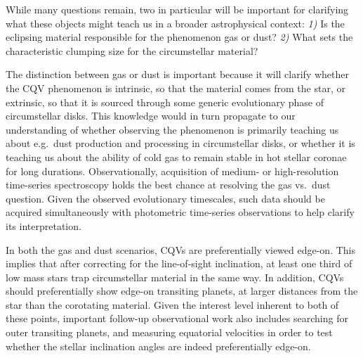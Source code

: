 \documentclass[11pt,twocolumn,tighten]{aastex63}
\begin{document}

While many questions remain, two in particular will be 
important for clarifying what these objects might teach us in a
broader astrophysical context: {\it 1)} Is the eclipsing material
responsible for the phenomenon gas or dust?  {\it 2)} What sets
the characteristic clumping size for the circumstellar material?

The distinction between gas or dust is important because it will
clarify whether the CQV phenomenon is intrinsic, so that the material
comes from the star, or extrinsic, so that it is sourced through some
generic evolutionary phase of circumstellar disks.  This knowledge would in
turn propagate to our understanding of whether observing the
phenomenon is primarily teaching us about e.g.~dust production and
processing in circumstellar disks, or whether it is teaching us about
the ability of cold gas to remain stable in hot stellar coronae for
long durations.
Observationally, acquisition of medium- or high-resolution time-series
spectroscopy holds the best chance at resolving the gas vs.~dust
question.  Given the observed evolutionary timescales, such data
should be acquired simultaneously with photometric time-series
observations to help clarify its interpretation.

In both the gas and dust scenarios, CQVs are preferentially viewed
edge-on.
This implies that after correcting for the line-of-sight inclination,
at least one third of low mass stars
\citep{2022AJ....163..144G} trap circumstellar
material in the same way.
In addition, CQVs should preferentially show edge-on
transiting planets, at larger distances from the star than the
corotating material.
Given the interest level inherent to both of these points, important follow-up
observational work also includes searching for outer transiting
planets, and measuring equatorial velocities in
order to test whether the stellar inclination angles are indeed
preferentially edge-on.
\end{document}
